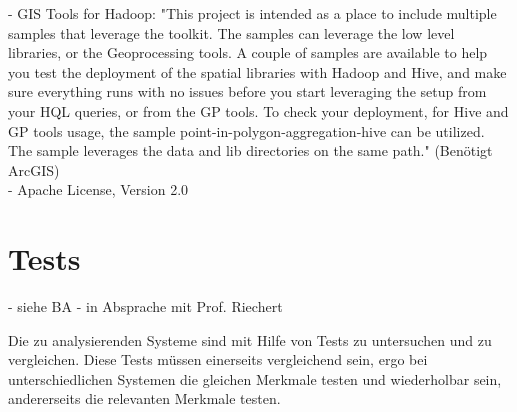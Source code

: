 - GIS Tools for Hadoop: "This project is intended as a place to include multiple samples that leverage the toolkit. The samples can leverage the low level libraries, or the Geoprocessing tools. A couple of samples are available to help you test the deployment of the spatial libraries with Hadoop and Hive, and make sure everything runs with no issues before you start leveraging the setup from your HQL queries, or from the GP tools. To check your deployment, for Hive and GP tools usage, the sample point-in-polygon-aggregation-hive can be utilized. The sample leverages the data and lib directories on the same path."\cite{website:esri-hadoop2} (Benötigt ArcGIS)\\
- Apache License, Version 2.0

\section{Tests}

- siehe BA
- in Absprache mit Prof. Riechert



Die zu analysierenden Systeme sind mit Hilfe von Tests zu untersuchen und zu vergleichen.
Diese Tests müssen einerseits vergleichend sein, ergo bei unterschiedlichen Systemen die gleichen Merkmale testen und wiederholbar sein, andererseits die relevanten Merkmale testen.


